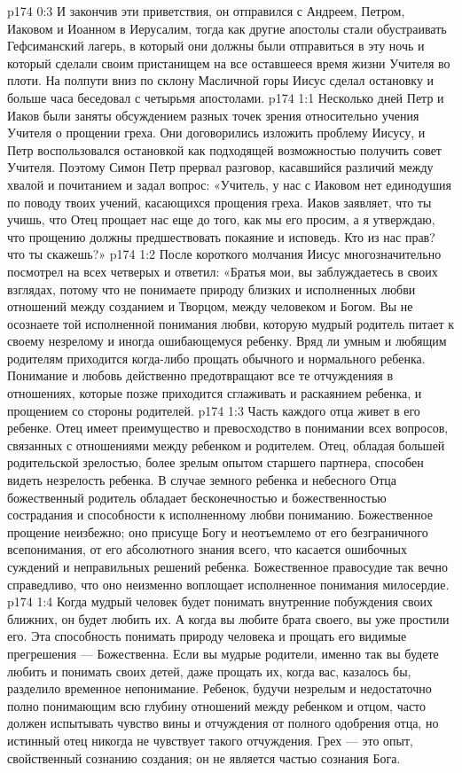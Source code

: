 \vs p174 0:3 И закончив эти приветствия, он отправился с Андреем, Петром, Иаковом и Иоанном в Иерусалим, тогда как другие апостолы стали обустраивать Гефсиманский лагерь, в который они должны были отправиться в эту ночь и который сделали своим пристанищем на все оставшееся время жизни Учителя во плоти. На полпути вниз по склону Масличной горы Иисус сделал остановку и больше часа беседовал с четырьмя апостолами.
\vs p174 1:1 Несколько дней Петр и Иаков были заняты обсуждением разных точек зрения относительно учения Учителя о прощении греха. Они договорились изложить проблему Иисусу, и Петр воспользовался остановкой как подходящей возможностью получить совет Учителя. Поэтому Симон Петр прервал разговор, касавшийся различий между хвалой и почитанием и задал вопрос: «Учитель, у нас с Иаковом нет единодушия по поводу твоих учений, касающихся прощения греха. Иаков заявляет, что ты учишь, что Отец прощает нас еще до того, как мы его просим, а я утверждаю, что прощению должны предшествовать покаяние и исповедь. Кто из нас прав? что ты скажешь?»
\vs p174 1:2 После короткого молчания Иисус многозначительно посмотрел на всех четверых и ответил: «Братья мои, вы заблуждаетесь в своих взглядах, потому что не понимаете природу близких и исполненных любви отношений между созданием и Творцом, между человеком и Богом. Вы не осознаете той исполненной понимания любви, которую мудрый родитель питает к своему незрелому и иногда ошибающемуся ребенку. Вряд ли умным и любящим родителям приходится когда\hyp{}либо прощать обычного и нормального ребенка. Понимание и любовь действенно предотвращают все те отчужденияя в отношениях, которые позже приходится сглаживать и раскаянием ребенка, и прощением со стороны родителей.
\vs p174 1:3 Часть каждого отца живет в его ребенке. Отец имеет преимущество и превосходство в понимании всех вопросов, связанных с отношениями между ребенком и родителем. Отец, обладая большей родительской зрелостью, более зрелым опытом старшего партнера, способен видеть незрелость ребенка. В случае земного ребенка и небесного Отца божественный родитель обладает бесконечностью и божественностью сострадания и способности к исполненному любви пониманию. Божественное прощение неизбежно; оно присуще Богу и неотъемлемо от его безграничного всепонимания, от его абсолютного знания всего, что касается ошибочных суждений и неправильных решений ребенка. Божественное правосудие так вечно справедливо, что оно неизменно воплощает исполненное понимания милосердие.
\vs p174 1:4 Когда мудрый человек будет понимать внутренние побуждения своих ближних, он будет любить их. А когда вы любите брата своего, вы уже простили его. Эта способность понимать природу человека и прощать его видимые прегрешения --- Божественна. Если вы мудрые родители, именно так вы будете любить и понимать своих детей, даже прощать их, когда вас, казалось бы, разделило временное непонимание. Ребенок, будучи незрелым и недостаточно полно понимающим всю глубину отношений между ребенком и отцом, часто должен испытывать чувство вины и отчуждения от полного одобрения отца, но истинный отец никогда не чувствует такого отчуждения. Грех --- это опыт, свойственный сознанию создания; он не является частью сознания Бога.
